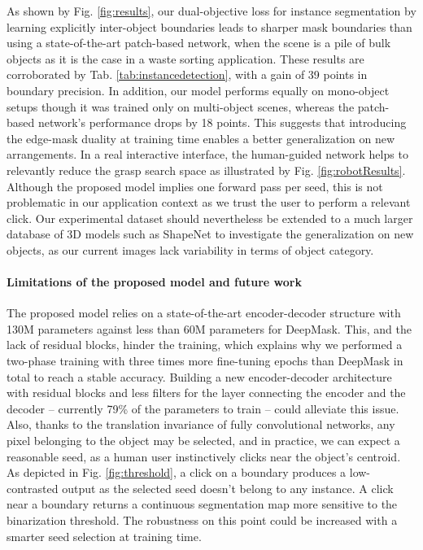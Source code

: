 \documentclass[runningheads,a4paper]{llncs}
\begin{document}
As shown by Fig. \ref{fig:results}, our dual-objective loss for instance segmentation by learning explicitly inter-object boundaries leads to sharper mask boundaries than using a state-of-the-art patch-based network, when the scene is a pile of bulk objects as it is the case in a waste sorting application. These results are corroborated by Tab. \ref{tab:instancedetection}, with a gain of 39 points in boundary precision. In addition, our model performs equally on mono-object setups though it was trained only on multi-object scenes, whereas the patch-based network's performance drops by 18 points. This suggests that introducing the edge-mask duality at training time enables a better generalization on new arrangements. In a real interactive interface, the human-guided network helps to relevantly reduce the grasp search space as illustrated by Fig. \ref{fig:robotResults}. Although the proposed model implies one forward pass per seed, this is not problematic in our application context as we trust the user to perform a relevant click. Our experimental dataset should nevertheless be extended to a much larger database of 3D models such as ShapeNet \cite{ChangFGHHLSSSSX15} to investigate the generalization on new objects, as our current images lack variability in terms of object category.

\paragraph{Limitations of the proposed model and future work}

The proposed model relies on a state-of-the-art encoder-decoder structure with 130M parameters against less than 60M parameters for DeepMask. This, and the lack of residual blocks, hinder the training, which explains why we performed a two-phase training with three times more fine-tuning epochs than DeepMask in total to reach a stable accuracy. Building a new encoder-decoder architecture with residual blocks and less filters for the layer connecting the encoder and the decoder -- currently 79\% of the parameters to train -- could alleviate this issue. Also, thanks to the translation invariance of fully convolutional networks, any pixel belonging to the object may be selected, and in practice, we can expect a reasonable seed, as a human user instinctively clicks near the object's centroid. As depicted in Fig. \ref{fig:threshold}, a click on a boundary produces a low-contrasted output as the selected seed doesn't belong to any instance. A click near a boundary returns a continuous segmentation map more sensitive to the binarization threshold. The robustness on this point could be increased with a smarter seed selection at training time.
\end{document}
